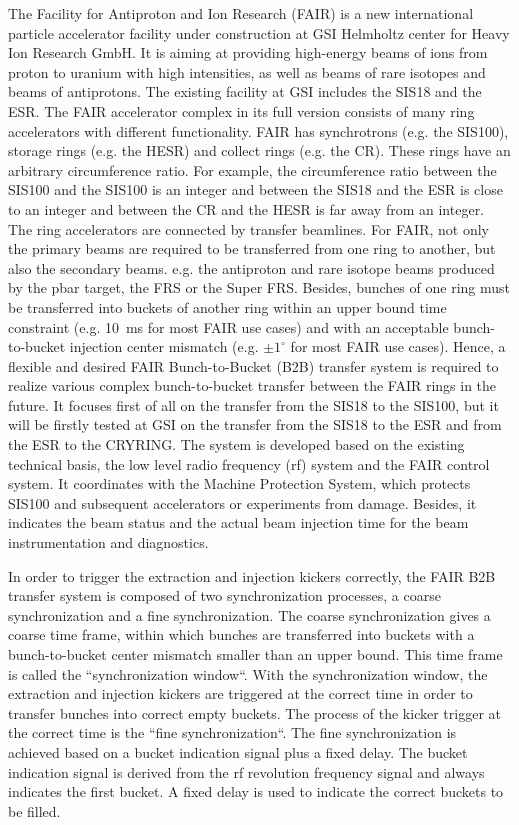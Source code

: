 The Facility for Antiproton and Ion Research (FAIR) is a new international particle accelerator facility under construction at GSI Helmholtz center for Heavy Ion Research GmbH. It is aiming at providing high-energy beams of ions from proton to uranium with high intensities, as well as beams of rare isotopes and beams of antiprotons. The existing facility at GSI includes the SIS18 and the ESR. The FAIR accelerator complex in its full version consists of many ring accelerators with different functionality. FAIR has synchrotrons (e.g. the SIS100), storage rings (e.g. the HESR) and collect rings (e.g. the CR). These rings have an arbitrary circumference ratio. For example, the circumference ratio between the SIS100 and the SIS100 is an integer and between the SIS18 and the ESR is close to an integer and between the CR and the HESR is far away from an integer. The ring accelerators are connected by transfer beamlines. For FAIR, not only the primary beams are required to be transferred from one ring to another, but also the secondary beams. e.g. the antiproton and rare isotope beams produced by the pbar target, the FRS or the Super FRS. Besides, bunches of one ring must be transferred into buckets of another ring within an upper bound time constraint (e.g. \SI{10}{\ms} for most FAIR use cases) and with an acceptable bunch-to-bucket injection center mismatch (e.g. $\pm1^\circ$ for most FAIR use cases). Hence, a flexible and desired FAIR Bunch-to-Bucket (B2B) transfer system is required to realize various complex bunch-to-bucket transfer between the FAIR rings in the future. It focuses first of all on the transfer from the SIS18 to the SIS100, but it will be firstly tested at GSI on the transfer from the SIS18 to the ESR and from the ESR to the CRYRING. The system is developed based on the existing technical basis, the low level radio frequency (rf) system and the FAIR control system. It coordinates with the Machine Protection System, which protects SIS100 and subsequent accelerators or experiments from damage. Besides, it indicates the beam status and the actual beam injection time for the beam instrumentation and diagnostics. 

In order to trigger the extraction and injection kickers correctly, the FAIR B2B transfer system is composed of two synchronization processes, a coarse synchronization and a fine synchronization. The coarse synchronization gives a coarse time frame, within which bunches are transferred into buckets with a bunch-to-bucket center mismatch smaller than an upper bound. This time frame is called the ``synchronization window``. With the synchronization window, the extraction and injection kickers are triggered at the correct time in order to transfer bunches into correct empty buckets. The process of the kicker trigger at the correct time is the ``fine synchronization``. The fine synchronization is achieved based on a bucket indication signal plus a fixed delay. The bucket indication signal is derived from the rf revolution frequency signal and always indicates the first bucket. A fixed delay is used to indicate the correct buckets to be filled.


